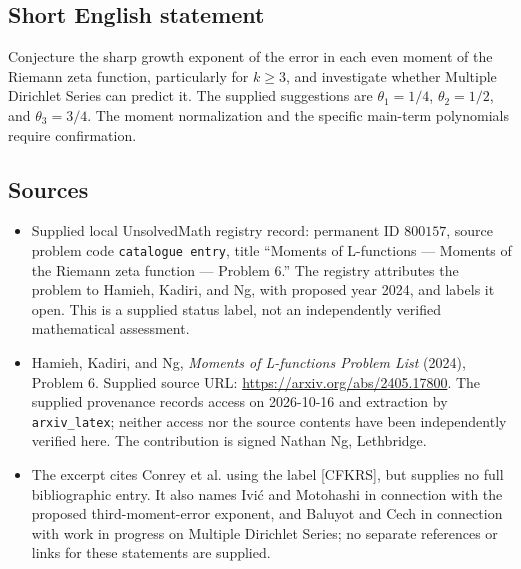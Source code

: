 \documentclass[11pt]{article}
\begin{document}
\subsection{Short English statement}
Conjecture the sharp growth exponent of the error in each even moment of the Riemann zeta function, particularly for \(k\geq3\), and investigate whether Multiple Dirichlet Series can predict it. The supplied suggestions are \(\theta_1=1/4\), \(\theta_2=1/2\), and \(\theta_3=3/4\). The moment normalization and the specific main-term polynomials require confirmation.
\subsection{Sources}
\begin{itemize}
\item Supplied local UnsolvedMath registry record: permanent ID \(800157\), source problem code \texttt{catalogue entry}, title ``Moments of L-functions --- Moments of the Riemann zeta function --- Problem 6.'' The registry attributes the problem to Hamieh, Kadiri, and Ng, with proposed year 2024, and labels it open. This is a supplied status label, not an independently verified mathematical assessment.
\item Hamieh, Kadiri, and Ng, \emph{Moments of L-functions Problem List} (2024), Problem 6. Supplied source URL: \url{https://arxiv.org/abs/2405.17800}. The supplied provenance records access on 2026-10-16 and extraction by \texttt{arxiv\_latex}; neither access nor the source contents have been independently verified here. The contribution is signed Nathan Ng, Lethbridge.
\item The excerpt cites Conrey et al. using the label [CFKRS], but supplies no full bibliographic entry. It also names Ivi\'c and Motohashi in connection with the proposed third-moment-error exponent, and Baluyot and Cech in connection with work in progress on Multiple Dirichlet Series; no separate references or links for these statements are supplied.
\end{itemize}
\end{document}
